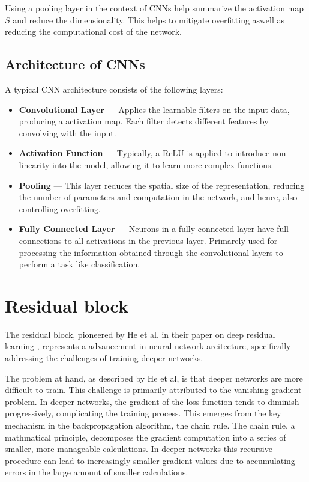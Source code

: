 

Using a pooling layer in the context of CNNs help summarize the activation map $S$ and reduce the dimensionality. This helps to mitigate overfitting aswell as reducing the computational cost of the network.

\subsection{Architecture of CNNs}
A typical CNN architecture consists of the following layers:

\begin{itemize}
    \item \textbf{Convolutional Layer} — Applies the learnable filters on the input data, producing a activation map. Each filter detects different features by convolving with the input.
    \item \textbf{Activation Function} — Typically, a ReLU is applied to introduce non-linearity into the model, allowing it to learn more complex functions.
    \item \textbf{Pooling} — This layer reduces the spatial size of the representation, reducing the number of parameters and computation in the network, and hence, also controlling overfitting. 
    \item \textbf{Fully Connected Layer} — Neurons in a fully connected layer have full connections to all activations in the previous layer. Primarely used for processing the information obtained through the convolutional layers to perform a task like classification.
\end{itemize}


\section{Residual block}
The residual block, pioneered by He et al. in their paper on deep residual learning \cite{ResLearn}, represents a advancement in neural network arcitecture, 
specifically addressing the challenges of training deeper networks.

The problem at hand, as described by He et al, is that deeper networks are more difficult to train. This challenge is primarily attributed to the vanishing gradient problem.
In deeper networks, the gradient of the loss function tends to diminish progressively, complicating the training process. 
This emerges from the key mechanism in the backpropagation algorithm, the chain rule. The chain rule, a mathmatical principle, decomposes the gradient computation into a series of smaller,
more manageable calculations. In deeper networks this recursive procedure can lead to increasingly smaller gradient values due to accumulating errors in the large amount of smaller calculations. 

